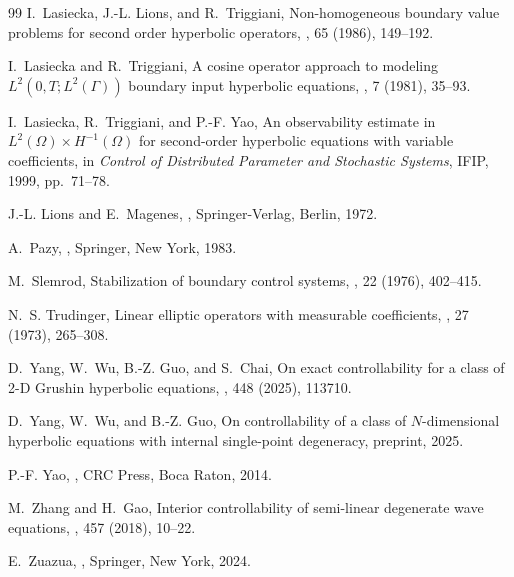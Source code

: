 \documentclass[preprint,12pt]{elsarticle}
\theoremstyle{definition}   %
\numberwithin{equation}{section}
\begin{document}
\begin{thebibliography}{99}
I.~Lasiecka, J.-L. Lions, and R.~Triggiani,
\newblock Non-homogeneous boundary value problems for second order hyperbolic operators,
, 65 (1986), 149--192.

I.~Lasiecka and R.~Triggiani,
\newblock A cosine operator approach to modeling $L^2(0,T;L^2(\Gamma))$ boundary input hyperbolic equations,
, 7 (1981), 35--93.

I.~Lasiecka, R.~Triggiani, and P.-F. Yao,
\newblock An observability estimate in $L^2(\Omega)\times H^{-1}(\Omega)$ for second-order hyperbolic equations with variable coefficients,
\newblock in {\em Control of Distributed Parameter and Stochastic Systems}, IFIP, 1999, pp.~71--78.

J.-L. Lions and E.~Magenes,
,
\newblock Springer-Verlag, Berlin, 1972.

A.~Pazy,
,
\newblock Springer, New York, 1983.

M.~Slemrod,
\newblock Stabilization of boundary control systems,
, 22 (1976), 402--415.

N.~S. Trudinger,
\newblock Linear elliptic operators with measurable coefficients,
, 27 (1973), 265--308.

D.~Yang, W.~Wu, B.-Z. Guo, and S.~Chai,
\newblock On exact controllability for a class of 2-D Grushin hyperbolic equations,
, 448 (2025), 113710.

D.~Yang, W.~Wu, and B.-Z. Guo,
\newblock On controllability of a class of $N$-dimensional hyperbolic equations with internal single-point degeneracy,
\newblock preprint, 2025.

P.-F. Yao,
,
\newblock CRC Press, Boca Raton, 2014.

M.~Zhang and H.~Gao,
\newblock Interior controllability of semi-linear degenerate wave equations,
, 457 (2018), 10--22.

E.~Zuazua,
,
\newblock Springer, New York, 2024.

\end{thebibliography}
\end{document}
